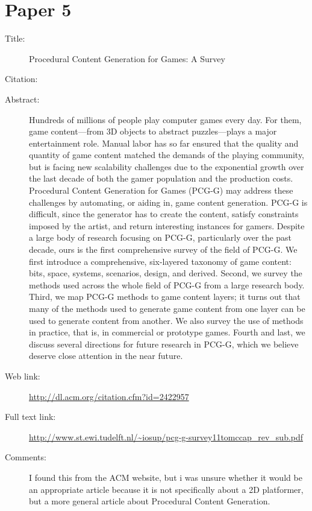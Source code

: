 \documentclass{scrartcl}
\begin{document}
\section*{Paper 5}
\begin{description}
\item[Title:] Procedural Content Generation for Games: A Survey
\item[Citation:] \cite{hendrikx2013}
\item[Abstract:] Hundreds of millions of people play computer games every day. For them, game content—from 3D objects to abstract puzzles—plays a major entertainment role. Manual labor has so far ensured that the quality and quantity of game content matched the demands of the playing community, but is facing new scalability challenges due to the exponential growth over the last decade of both the gamer population and the production costs. Procedural Content Generation for Games (PCG-G) may address these challenges by automating, or aiding in, game content generation. PCG-G is difficult, since the generator has to create the content, satisfy constraints imposed by the artist, and return interesting instances for gamers. Despite a large body of research focusing on PCG-G, particularly over the past decade, ours is the first comprehensive survey of the field of PCG-G. We first introduce a comprehensive, six-layered taxonomy of game content: bits, space, systems, scenarios, design, and derived. Second, we survey the methods used across the whole field of PCG-G from a large research body. Third, we map PCG-G methods to game content layers; it turns out that many of the methods used to generate game content from one layer can be used to generate content from another. We also survey the use of methods in practice, that is, in commercial or prototype games. Fourth and last, we discuss several directions for future research in PCG-G, which we believe deserve close attention in the near future.

\item[Web link:] \url{http://dl.acm.org/citation.cfm?id=2422957}
\item[Full text link:] \url{http://www.st.ewi.tudelft.nl/~iosup/pcg-g-survey11tomccap_rev_sub.pdf}
\item[Comments:] I found this from the ACM website, but i was unsure whether it would be an appropriate article because it is not specifically about a 2D platformer, but a more general article about Procedural Content Generation.
\end{description}



\end{document}
